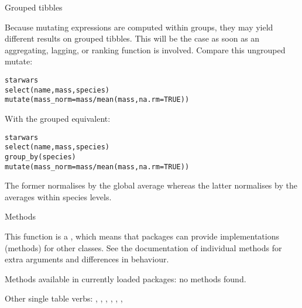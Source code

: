 \documentclass[a4paper]{book}
\begin{document}
%
\begin{Section}{Grouped tibbles}


Because mutating expressions are computed within groups, they may
yield different results on grouped tibbles. This will be the case
as soon as an aggregating, lagging, or ranking function is
involved. Compare this ungrouped mutate:

\begin{alltt}starwars %>%
  select(name, mass, species) %>%
  mutate(mass_norm = mass / mean(mass, na.rm = TRUE))
\end{alltt}


With the grouped equivalent:

\begin{alltt}starwars %>%
  select(name, mass, species) %>%
  group_by(species) %>%
  mutate(mass_norm = mass / mean(mass, na.rm = TRUE))
\end{alltt}


The former normalises  by the global average whereas the
latter normalises by the averages within species levels.
\end{Section}
%
\begin{Section}{Methods}

This function is a , which means that packages can provide
implementations (methods) for other classes. See the documentation of
individual methods for extra arguments and differences in behaviour.

Methods available in currently loaded packages:
no methods found.
\end{Section}
%
\begin{SeeAlso}
Other single table verbs: 
,
,
,
,
,
,
\end{SeeAlso}
%
\end{document}
